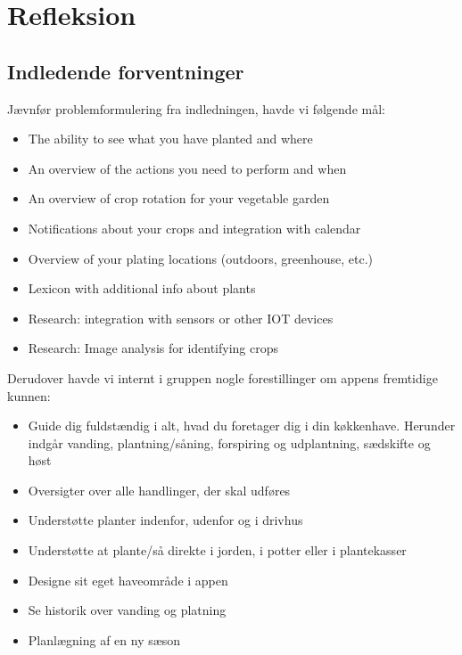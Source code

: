 \label{refleksion}
\section{Refleksion}

\subsection{Indledende forventninger}
Jævnfør problemformulering fra indledningen, havde vi følgende mål:

\begin{itemize}
        \item
    The ability to see what you have planted and where
        \item
    An overview of the actions you need to perform and when
        \item
    An overview of crop rotation for your vegetable garden
        \item
    Notifications about your crops and integration with calendar
        \item
    Overview of your plating locations (outdoors, greenhouse, etc.)
        \item
    Lexicon with additional info about plants 
        \item
    Research: integration with sensors or other IOT devices
        \item
    Research: Image analysis for identifying crops
\end{itemize}

Derudover havde vi internt i gruppen nogle forestillinger om appens fremtidige kunnen:

\begin{itemize}
    \item Guide dig fuldstændig i alt, hvad du foretager dig i din køkkenhave. Herunder indgår vanding, plantning/såning, forspiring og udplantning, sædskifte og høst
    \item Oversigter over alle handlinger, der skal udføres
    \item Understøtte planter indenfor, udenfor og i drivhus
    \item Understøtte at plante/så direkte i jorden, i potter eller i plantekasser
    \item Designe sit eget haveområde i appen
    \item Se historik over vanding og platning
    \item Planlægning af en ny sæson
\end{itemize}

